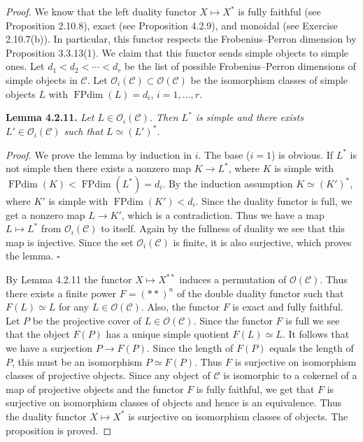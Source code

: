 \documentclass[11pt]{article}
\DeclareMathOperator{\FPdim}{FPdim}
\newcommand{\Cat}{\mathcal C}
\newcommand{\Obj}{\mathcal O}
\begin{document}
\begin{proof}
We know that the left duality functor $X\mapsto X^*$ is fully faithful
(see Proposition 2.10.8), exact (see Proposition 4.2.9), and monoidal
(see Exercise 2.10.7(b)). In particular, this functor respects the
Frobenius--Perron dimension by Proposition 3.3.13(1). We claim that this
functor sends simple objects to simple ones. Let
$d_1<d_2<\cdots<d_r$ be the list of possible Frobenius--Perron dimensions
of simple objects in $\Cat$. Let $\Obj_i(\Cat)\subset\Obj(\Cat)$ be the
isomorphism classes of simple objects $L$ with $\FPdim(L)=d_i$,
$i=1,\ldots,r$.

\medskip\noindent\textbf{Lemma 4.2.11.}
\emph{Let $L\in\Obj_i(\Cat)$. Then $L^*$ is simple and there exists
$L'\in\Obj_i(\Cat)$ such that $L\simeq(L')^*$.}

\smallskip\noindent\emph{Proof.}
We prove the lemma by induction in $i$. The base ($i=1$) is obvious.
If $L^*$ is not simple then there exists a nonzero map $K\to L^*$,
where $K$ is simple with $\FPdim(K)<\FPdim(L^*)=d_i$. By the
induction assumption $K\simeq(K')^*$, where $K'$ is simple with
$\FPdim(K')<d_i$. Since the duality functor is full, we get a nonzero
map $L\to K'$, which is a contradiction. Thus we have a map
$L\mapsto L^*$ from $\Obj_i(\Cat)$ to itself. Again by the fullness of
duality we see that this map is injective. Since the set
$\Obj_i(\Cat)$ is finite, it is also surjective, which proves the lemma.
\hfill$\square$

\medskip
By Lemma 4.2.11 the functor $X\mapsto X^{**}$ induces a permutation
of $\Obj(\Cat)$. Thus there exists a finite power $F=(**)^{n}$ of the
double duality functor such that $F(L)\simeq L$ for any
$L\in\Obj(\Cat)$. Also, the functor $F$ is exact and fully faithful.
Let $P$ be the projective cover of $L\in\Obj(\Cat)$. Since the functor
$F$ is full we see that the object $F(P)$ has a unique simple quotient
$F(L)\simeq L$. It follows that we have a surjection $P\to F(P)$.
Since the length of $F(P)$ equals the length of $P$, this must be an
isomorphism $P\simeq F(P)$. Thus $F$ is surjective on isomorphism
classes of projective objects. Since any object of $\Cat$ is isomorphic
to a cokernel of a map of projective objects and the functor $F$ is
fully faithful, we get that $F$ is surjective on isomorphism classes of
objects and hence is an equivalence. Thus the duality functor
$X\mapsto X^*$ is surjective on isomorphism classes of objects. The
proposition is proved.
\end{proof}
\end{document}
